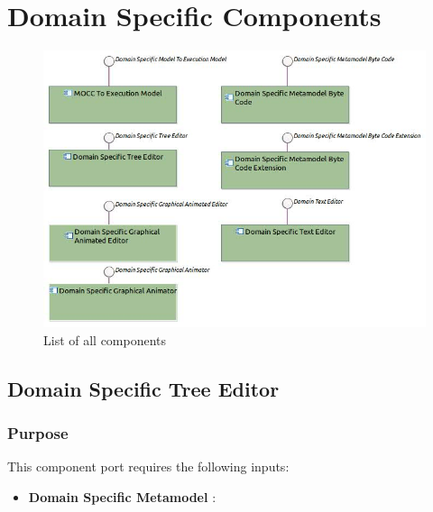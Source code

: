 \documentclass{gemoc} %
\begin{document}
\section{Domain Specific Components}
\begin{figure}[bt]
	\begin{center}
	\includegraphics*[trim=0.0cm 0.0cm 0cm 0.0cm, clip=true, width=1.0\linewidth]{../images/DomainSpecificComponents.jpg}
	\caption{List of all components}
	\label{fig:DomainSpecificComponentList}
	\end{center}
\end{figure}
\subsection{Domain Specific Tree Editor}


\subsubsection{Purpose}

This component port requires the following inputs:
\begin{itemize}
  \item \textbf{Domain Specific Metamodel} :
\end{itemize}
\end{document}

